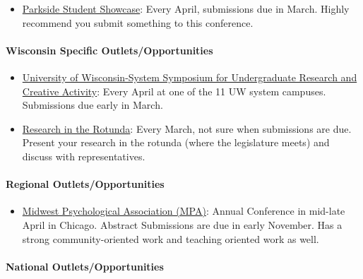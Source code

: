 \documentclass[
]{book}
\providecommand{\tightlist}{%
  \setlength{\itemsep}{0pt}\setlength{\parskip}{0pt}}
\begin{document}
\begin{itemize}
\tightlist
\item
  \href{https://www.uwp.edu/learn/beyondtheclassroom/research/student-showcase.cfm}{Parkside Student Showcase}: Every April, submissions due in March. Highly recommend you submit something to this conference.
\end{itemize}

\hypertarget{wisconsin-specific-outletsopportunities}{%
\paragraph{Wisconsin Specific Outlets/Opportunities}\label{wisconsin-specific-outletsopportunities}}

\begin{itemize}
\item
  \href{https://www.uwp.edu/learn/beyondtheclassroom/research/symposiumurca.cfm}{University of Wisconsin-System Symposium for Undergraduate Research and Creative Activity}: Every April at one of the 11 UW system campuses. Submissions due early in March.
\item
  \href{https://www.wisconsin.edu/research-in-the-rotunda/}{Research in the Rotunda}: Every March, not sure when submissions are due. Present your research in the rotunda (where the legislature meets) and discuss with representatives.
\end{itemize}

\hypertarget{regional-outletsopportunities}{%
\paragraph{Regional Outlets/Opportunities}\label{regional-outletsopportunities}}

\begin{itemize}
\tightlist
\item
  \href{https://midwesternpsych.org/}{Midwest Psychological Association (MPA)}: Annual Conference in mid-late April in Chicago. Abstract Submissions are due in early November. Has a strong community-oriented work and teaching oriented work as well.
\end{itemize}

\hypertarget{national-outletsopportunities}{%
\paragraph{National Outlets/Opportunities}\label{national-outletsopportunities}}
\end{document}

